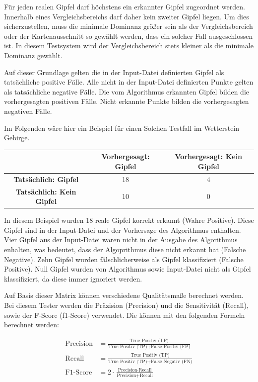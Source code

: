 Für jeden realen Gipfel darf höchstens ein erkannter Gipfel zugeordnet werden. Innerhalb eines Vergleichsbereichs darf daher kein zweiter Gipfel liegen. Um dies sicherzustellen, muss die minimale Dominanz größer sein als der Vergleichsbereich oder der Kartenausschnitt so gewählt werden, dass ein solcher Fall ausgeschlossen ist. In diesem Testsystem wird der Vergleichsbereich stets kleiner als die minimale Dominanz gewählt.

Auf dieser Grundlage gelten die in der Input-Datei definierten Gipfel als tatsächliche positive Fälle. Alle nicht in der Input-Datei definierten Punkte gelten als tatsächliche negative Fälle. Die vom Algorithmus erkannten Gipfel bilden die vorhergesagten positiven Fälle. Nicht erkannte Punkte bilden die vorhergesagten negativen Fälle. 

Im Folgenden wäre hier ein Beispiel für einen Solchen Testfall im Wetterstein Gebirge.

\begin{center}
\begin{tabular}{|c|c|c|}
\hline
 & \textbf{Vorhergesagt: Gipfel} & \textbf{Vorhergesagt: Kein Gipfel} \\
\hline
\textbf{Tatsächlich: Gipfel} & 18 & 4 \\
\hline
\textbf{Tatsächlich: Kein Gipfel} & 10 & 0 \\
\hline
\end{tabular}
\end{center}

In diesem Beispiel wurden 18 reale Gipfel korrekt erkannt (Wahre Positive). Diese Gipfel sind in der Input-Datei und der Vorhersage des Algorithmus enthalten. Vier Gipfel aus der Input-Datei waren nicht in der Ausgabe des Algorithmus enhalten, was bedeutet, dass der Algoprithmus diese nicht erkannt hat (Falsche Negative). Zehn Gipfel wurden fälschlicherweise als Gipfel klassifiziert (Falsche Positive). Null Gipfel wurden von Algorithmus sowie Input-Datei nicht als Gipfel klassifiziert, da diese immer ignoriert werden.

Auf Basis dieser Matrix können verschiedene Qualitätsmaße berechnet werden. Bei diesem Tester werden die Präzision (Precision) und die Sensitivität (Recall), sowie der F-Score (f1-Score) verwendet. Die können mit den folgenden Formeln berechnet werden:

\begin{align}
\text{Precision} &= \frac{\text{True Positiv (TP)}}{\text{True Positiv (TP)} + \text{False Positiv (FP)}} \\[1em]
\text{Recall} &= \frac{\text{True Positiv (TP)}}{\text{True Positiv (TP)} + \text{False Negativ (FN)}} \\[1em]
\text{F1-Score} &= 2 \cdot \frac{\text{Precision} \cdot \text{Recall}}{\text{Precision} + \text{Recall}}
\end{align} 


